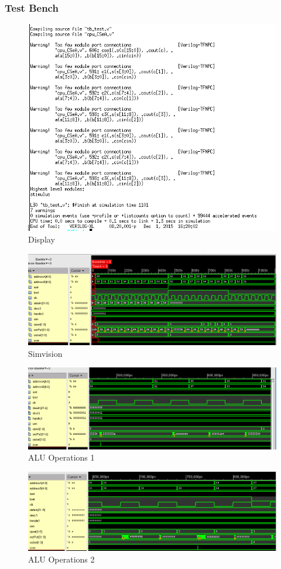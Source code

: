 \documentclass[12pt]{article}
\begin{document}
\subsubsection{Test Bench}
\begin{figure}[H]
\centering
\includegraphics[width=.7\linewidth]{../CSeA/test-text}
\caption{Display}
\label{fig:test-text}
\end{figure}
\begin{figure}[H]
\centering
\includegraphics[width=\linewidth]{../CSeA/test-test}
\caption{Simvision}
\label{fig:test-test}
\end{figure}


\begin{figure}[H]
\centering
\includegraphics[width=\linewidth]{../CSeA/alu1}
\caption{ALU Operations 1}
\label{fig:alu1}
\end{figure}
\begin{figure}[H]
\centering
\includegraphics[width=\linewidth]{../CSeA/alu2}
\caption{ALU Operations 2}
\label{fig:alu2}
\end{figure}
\end{document}
